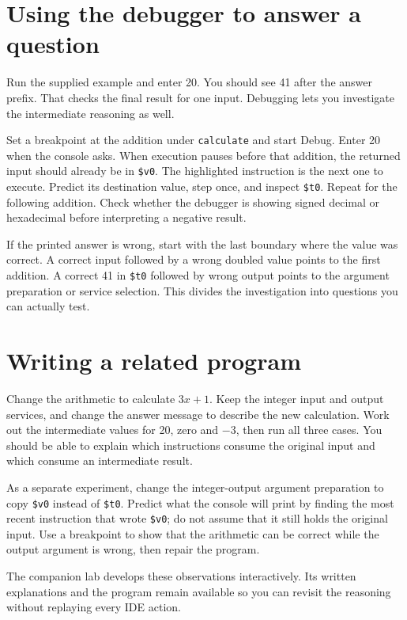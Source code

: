 \section{Using the debugger to answer a question}

Run the supplied example and enter 20. You should see 41 after the answer prefix.
That checks the final result for one input. Debugging lets you investigate the
intermediate reasoning as well.

Set a breakpoint at the addition under \texttt{calculate} and start Debug. Enter
20 when the console asks. When execution pauses before that addition, the returned
input should already be in \texttt{\$v0}. The highlighted instruction is the next
one to execute. Predict its destination value, step once, and inspect
\texttt{\$t0}. Repeat for the following addition. Check whether the debugger is
showing signed decimal or hexadecimal before interpreting a negative result.

If the printed answer is wrong, start with the last boundary where the value was
correct. A correct input followed by a wrong doubled value points to the first
addition. A correct 41 in \texttt{\$t0} followed by wrong output points to the
argument preparation or service selection. This divides the investigation into
questions you can actually test.

\section{Writing a related program}

Change the arithmetic to calculate $3x+1$. Keep the integer input and output
services, and change the answer message to describe the new calculation. Work out
the intermediate values for 20, zero and $-3$, then run all three cases. You should be able to explain which instructions consume the original
input and which consume an intermediate result.

As a separate experiment, change the integer-output argument preparation to copy
\texttt{\$v0} instead of \texttt{\$t0}. Predict what the console will print by
finding the most recent instruction that wrote \texttt{\$v0}; do not assume that
it still holds the original input. Use a breakpoint to show that the arithmetic
can be correct while the output argument is wrong, then repair the program.

The companion lab develops these observations interactively. Its written
explanations and the program remain available so you can revisit the reasoning
without replaying every IDE action.
